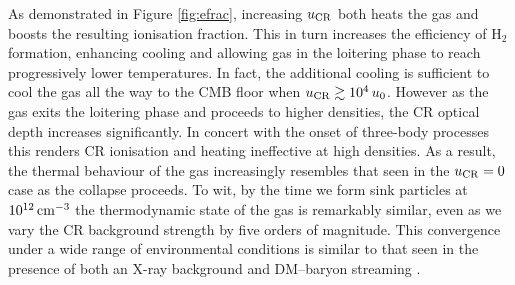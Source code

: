 \documentclass[usenatbib]{mn2e}
\newcommand{\cc}{\,{\rm cm}^{-3}}
\newcommand{\htwo}{\mathrm{H}_2}
\newcommand{\ucr}{{u}_{\rm \small CR}}
\begin{document}
As demonstrated in Figure \ref{fig:efrac}, increasing $\ucr$ both heats the gas and boosts the resulting ionisation fraction.
This in turn increases the efficiency of $\htwo$ formation, enhancing cooling and allowing gas in the loitering phase to reach progressively lower temperatures. 
In fact, the additional cooling is sufficient to cool the gas all the way to the CMB floor when $\ucr \gtrsim 10^4\,u_0$. 
However as the gas exits the loitering phase and proceeds to higher densities, the CR optical depth increases significantly. 
In concert with the onset of three-body processes this renders CR ionisation and heating ineffective at high densities. 
As a result, the thermal behaviour of the gas increasingly resembles that seen in the $\ucr=0$ case as the collapse proceeds. 
To wit, by the time we form sink particles at  $10^{12}\cc$ the thermodynamic state of the gas is remarkably similar, even as we vary the CR background strength by five orders of magnitude.
This convergence under a wide range of environmental conditions is similar to that seen in the presence of both an X-ray background \citep{Hummeletal2015} and DM--baryon streaming \citep{StacyBrommLoeb2011a,Greifetal2011b}.
\end{document}
